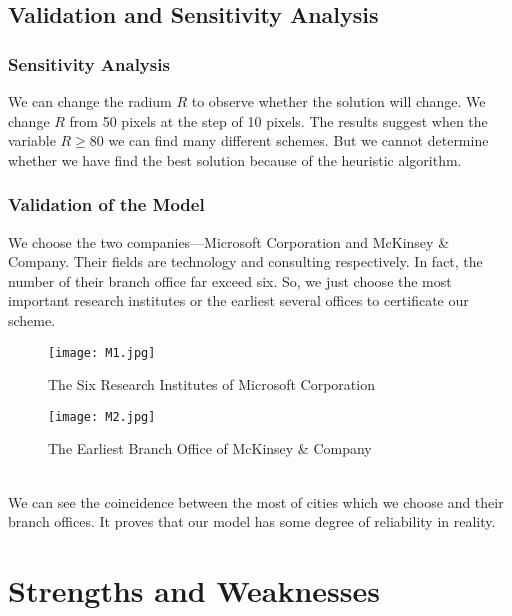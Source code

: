 \documentclass{mcmthesis}
\begin{document}
\subsection{Validation and Sensitivity Analysis}
\subsubsection{Sensitivity Analysis}
We can change the radium \(R\) to observe whether the solution will change. We change \(R\) from 50 pixels at the step of 10 pixels. The results suggest when the variable \(R\geqslant80\) we can find many different schemes. But we cannot determine whether we have find the best solution because of the heuristic algorithm.

\subsubsection{Validation of the Model}
\indent We choose the two companies---Microsoft Corporation and McKinsey \& Company. Their fields are technology and consulting respectively. In fact, the number of their branch office far exceed six. So, we just choose the most important research institutes or the earliest several offices to certificate our scheme.\\ \begin{figure}[htbp]
\small\centering
\texttt{[image: M1.jpg]}
\caption{The Six Research Institutes of Microsoft Corporation}
\end{figure}
\begin{figure}[htbp]
\small\centering
\texttt{[image: M2.jpg]}
\caption{The Earliest Branch Office of McKinsey \& Company}
\end{figure}\\
\indent We can see the coincidence between the most of cities which we choose and their branch offices. It proves that our model has some degree of reliability in reality. 

\section{Strengths and Weaknesses}
\end{document}
